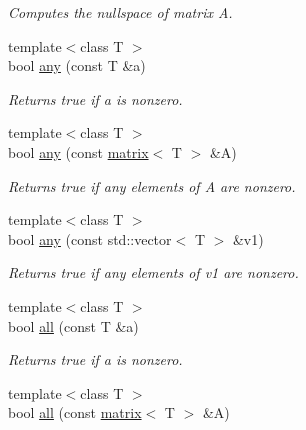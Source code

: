 \begin{DoxyCompactItemize}
\begin{DoxyCompactList}\small\item\em Computes the nullspace of matrix A. \end{DoxyCompactList}\item 
\hypertarget{namespacekeycpp_a70b89ab3e8f66f86c47c3bde004d4487}{{\footnotesize template$<$class T $>$ }\\bool \hyperlink{namespacekeycpp_a70b89ab3e8f66f86c47c3bde004d4487}{any} (const T \&a)}\label{namespacekeycpp_a70b89ab3e8f66f86c47c3bde004d4487}

\begin{DoxyCompactList}\small\item\em Returns true if a is nonzero. \end{DoxyCompactList}\item 
\hypertarget{namespacekeycpp_ade6d308fd22d34ad4860e5fcd22ccb39}{{\footnotesize template$<$class T $>$ }\\bool \hyperlink{namespacekeycpp_ade6d308fd22d34ad4860e5fcd22ccb39}{any} (const \hyperlink{classkeycpp_1_1matrix}{matrix}$<$ T $>$ \&A)}\label{namespacekeycpp_ade6d308fd22d34ad4860e5fcd22ccb39}

\begin{DoxyCompactList}\small\item\em Returns true if any elements of A are nonzero. \end{DoxyCompactList}\item 
\hypertarget{namespacekeycpp_a01b100190bc21b024340b7bddd4467dd}{{\footnotesize template$<$class T $>$ }\\bool \hyperlink{namespacekeycpp_a01b100190bc21b024340b7bddd4467dd}{any} (const std\-::vector$<$ T $>$ \&v1)}\label{namespacekeycpp_a01b100190bc21b024340b7bddd4467dd}

\begin{DoxyCompactList}\small\item\em Returns true if any elements of v1 are nonzero. \end{DoxyCompactList}\item 
\hypertarget{namespacekeycpp_aab77d82d9cc7d1fcca87967048f09e0e}{{\footnotesize template$<$class T $>$ }\\bool \hyperlink{namespacekeycpp_aab77d82d9cc7d1fcca87967048f09e0e}{all} (const T \&a)}\label{namespacekeycpp_aab77d82d9cc7d1fcca87967048f09e0e}

\begin{DoxyCompactList}\small\item\em Returns true if a is nonzero. \end{DoxyCompactList}\item 
\hypertarget{namespacekeycpp_a0ebd51ca90981278382a922c04ee7a75}{{\footnotesize template$<$class T $>$ }\\bool \hyperlink{namespacekeycpp_a0ebd51ca90981278382a922c04ee7a75}{all} (const \hyperlink{classkeycpp_1_1matrix}{matrix}$<$ T $>$ \&A)}\label{namespacekeycpp_a0ebd51ca90981278382a922c04ee7a75}


\end{DoxyCompactItemize}
